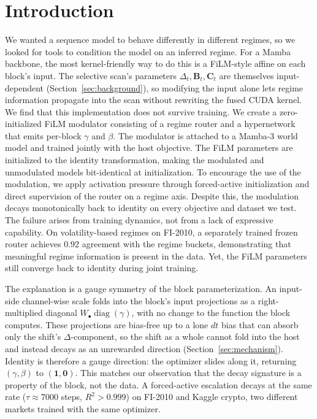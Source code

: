 \documentclass{article}
\DeclareMathOperator{\diag}{diag}
\begin{document}
\section{Introduction}
    We wanted a sequence model to behave differently in different regimes, so we looked for tools to condition the model on an inferred regime. For a Mamba backbone, the most kernel-friendly way to do this is a FiLM-style affine on each block's input. The selective scan's parameters $\Delta_t,\mathbf{B}_t,\mathbf{C}_t$ are themselves input-dependent (Section~\ref{sec:background}), so modifying the input alone lets regime information propagate into the scan without rewriting the fused CUDA kernel. We find that this implementation does not survive training. We create a zero-initialized FiLM modulator consisting of a regime router and a hypernetwork that emits per-block $\gamma$ and $\beta$. The modulator is attached to a Mamba-3 world model and trained jointly with the host objective. The FiLM parameters are initialized to the identity transformation, making the modulated and unmodulated models bit-identical at initialization. To encourage the use of the modulation, we apply activation pressure through forced-active initialization and direct supervision of the router on a regime axis. Despite this, the modulation decays monotonically back to identity on every objective and dataset we test. The failure arises from training dynamics, not from a lack of expressive capability. 
    On volatility-based regimes on FI-2010, a separately trained frozen router achieves 0.92 agreement with the regime buckets, demonstrating that meaningful regime information is present in the data. Yet, the FiLM parameters still converge back to identity during joint training.

The explanation is a gauge symmetry of the block parameterization. An input-side channel-wise scale folds into the block's input projections as a right-multiplied diagonal $W_\bullet\diag(\gamma)$, with no change to the function the block computes. These projections are bias-free up to a lone $dt$ bias that can absorb only the shift's $\Delta$-component, so the shift as a whole cannot fold into the host and instead decays as an unrewarded direction (Section~\ref{sec:mechanism}). Identity is therefore a gauge direction: the optimizer slides along it, returning $(\gamma,\beta)$ to $(\mathbf{1},\mathbf{0})$. This matches our observation that the decay signature is a property of the block, not the data. A forced-active escalation decays at the same rate ($\tau\approx7000$ steps, $R^2>0.999$) on FI-2010 and Kaggle crypto, two different markets trained with the same optimizer.
\end{document}
